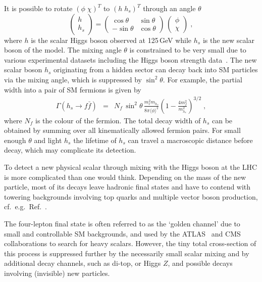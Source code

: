 \documentclass[10pt]{article}
\begin{document}
%
It is possible to rotate $(\phi\; \chi)^T$ to $(h \; h_{s})^T$ 
through an angle $\theta$
%
\begin{equation}
\left( \begin{array}{c}
h \\ 
h_{s}  \end{array} \right ) 
= 
\left( \begin{array}{cc} 
\cos\theta & \sin \theta \\
- \sin \theta & \cos\theta  \end{array} \right )\,
\left( \begin{array}{c}
\phi \\ 
\chi  \end{array} \right ) \;,
\end{equation}
%
where $h$ is the scalar Higgs boson observed at 125\,GeV while $h_s$ 
is the new scalar boson of the model. The mixing angle $\theta$ is
constrained to be very small due to various experimental datasets
including the Higgs boson strength data~\cite{Chang:2016lfq}. The new
scalar boson $h_s$ originating from a hidden sector can decay 
back into SM particles via the mixing angle, which is suppressed
by $\sin^2\theta$. For example, the partial width into a pair 
of SM fermions is given by 
%
\begin{eqnarray}
\Gamma ( h_{s} \to f \bar f) &=& N_f \, \sin^2{\theta} \, 
\frac{m_\ell^2 m_{h_{s}}}{ 8 \pi \langle \phi \rangle^2 } \left( 1 - 
\frac{4 m_f^2}{m_{h_{s}}^2 } \right )^{3/2}\;,  \label{eqn:Gammahs2ll}
\end{eqnarray}
%
where $N_f$ is the colour of the fermion. The total decay width of $h_s$ 
can be obtained by summing over all kinematically allowed fermion pairs. 
For small enough $\theta$ and light $h_s$ the lifetime of $h_s$ can travel a macroscopic distance before decay, which may complicate its detection.

To detect a new physical scalar through mixing with the Higgs boson at the LHC is more complicated than one would think. Depending on the mass of the new particle, most of its decays leave hadronic final states and have to contend with towering backgrounds involving top quarks and multiple vector boson production, cf.\ e.g.\ Ref.~\cite{CMS:2015hra}.

The four-lepton final state is often referred to as the `golden channel' due to small and controllable SM backgrounds, and used by the ATLAS~\cite{ATLAS:2017tlw} and CMS~\cite{CMS:2018mmw} collaborations  to search for heavy scalars. 
However, the tiny total cross-section of this process is suppressed further by the necessarily small scalar mixing and by additional decay channels, such as di-top, or Higgs $Z$, and possible decays involving (invisible) new particles.
\end{document}
